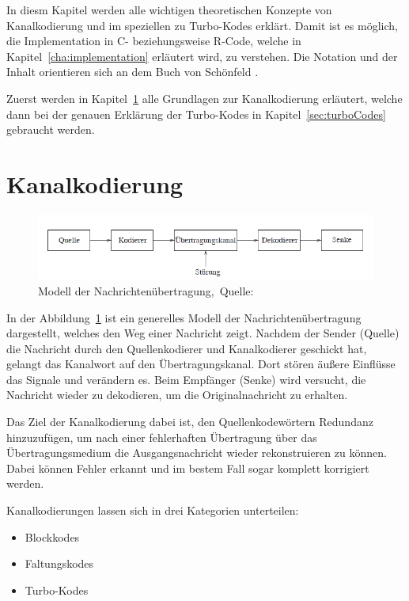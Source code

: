 In diesm Kapitel werden alle wichtigen theoretischen Konzepte von Kanalkodierung und im speziellen zu Turbo-Kodes erklärt. Damit ist es möglich, die Implementation in C- beziehungsweise R-Code, welche in Kapitel~\ref{cha:implementation} erläutert wird, zu verstehen. Die Notation und der Inhalt orientieren sich an dem Buch von Schönfeld \cite{schoenfeld2012informations}.

Zuerst werden in Kapitel~\ref{sec:channelcoding} alle Grundlagen zur Kanalkodierung erläutert, welche dann bei der genauen Erklärung der Turbo-Kodes in Kapitel~\ref{sec:turboCodes} gebraucht werden.

\section{Kanalkodierung}
\label{sec:channelcoding}

\begin{figure}[th]
\centering
\includegraphics[width=\ScaleIfNeeded]{pictures/Channelmodel}
\caption{Modell der Nachrichtenübertragung,~Quelle:~\cite[10]{schoenfeld2012informations}}
\label{pic:channelmodel}
\end{figure}

In der Abbildung~\ref{pic:channelmodel} ist ein generelles Modell der Nachrichtenübertragung dargestellt, welches den Weg einer Nachricht zeigt. Nachdem der Sender (Quelle) die Nachricht durch den Quellenkodierer und Kanalkodierer geschickt hat, gelangt das Kanalwort auf den Übertragungskanal. Dort stören äußere Einflüsse das Signale und verändern es. Beim Empfänger (Senke) wird versucht, die Nachricht wieder zu dekodieren, um die Originalnachricht zu erhalten.

Das Ziel der Kanalkodierung dabei ist, den Quellenkodewörtern Redundanz hinzuzufügen, um nach einer fehlerhaften Übertragung über das Übertragungsmedium die Ausgangsnachricht wieder rekonstruieren zu können. Dabei können Fehler erkannt und im bestem Fall sogar komplett korrigiert werden.

Kanalkodierungen lassen sich in drei Kategorien unterteilen:

\begin{itemize}
\item Blockkodes
\item Faltungskodes
\item Turbo-Kodes
\end{itemize} 

